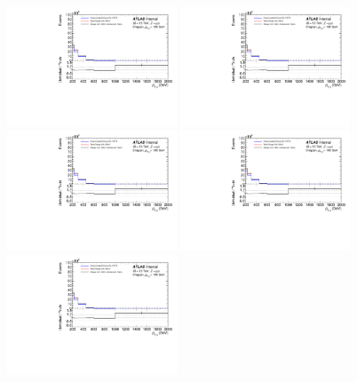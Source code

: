 \begin{figure}
  \centering
  \includegraphics[page=88,width=0.45\textwidth]{figures/IBUPlots.pdf}
  \includegraphics[page=95,width=0.45\textwidth]{figures/IBUPlots.pdf} \\
  \includegraphics[page=89,width=0.45\textwidth]{figures/IBUPlots.pdf}
  \includegraphics[page=96,width=0.45\textwidth]{figures/IBUPlots.pdf} \\
  \includegraphics[page=90,width=0.45\textwidth]{figures/IBUPlots.pdf}

\end{figure}
